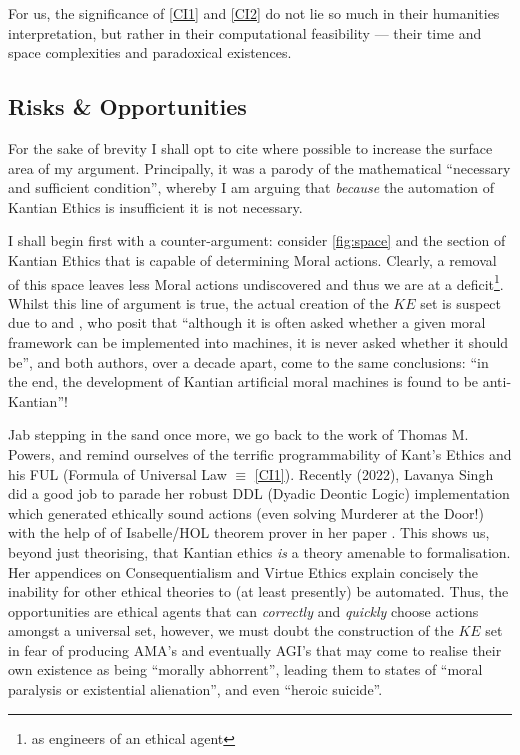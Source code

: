 \documentclass{scrartcl}
\begin{document}
For us, the significance of \ref{CI1} and \ref{CI2} do not lie so much in their humanities interpretation, but rather in their computational feasibility --- their time and space complexities and paradoxical existences.

\subsection{Risks \& Opportunities}
For the sake of brevity I shall opt to cite where possible to increase the surface area of my argument. Principally, it was a parody of the mathematical ``necessary and sufficient condition'', whereby I am arguing that \emph{because} the automation of Kantian Ethics is insufficient it is not necessary.

I shall begin first with a counter-argument: consider \ref{fig:space} and the section of Kantian Ethics that is capable of determining Moral actions. Clearly, a removal of this space leaves less Moral actions undiscovered and thus we are at a deficit\footnote{as engineers of an ethical agent}. Whilst this line of argument is true, the actual creation of the \(KE\) set is suspect due to \cite{Tonkens2009} and \cite{Nath2021}, who posit that \enquote{although it is often asked whether a given moral framework can be implemented into machines, it is never asked whether it should be}, and both authors, over a decade apart, come to the same conclusions: \enquote{in the end, the development of Kantian artificial moral machines is found to be anti-Kantian}!

Jab stepping in the sand once more, we go back to the work of Thomas M. Powers, and remind ourselves of the terrific programmability of Kant's Ethics and his FUL (Formula of Universal Law \(\equiv\) \ref{CI1}). Recently (2022), Lavanya Singh did a good job to parade her robust DDL (Dyadic Deontic Logic) implementation which generated ethically sound actions (even solving Murderer at the Door!) with the help of of Isabelle/HOL theorem prover in her paper \cite{Singh2022}. This shows us, beyond just theorising, that Kantian ethics \emph{is} a theory amenable to formalisation. Her appendices on Consequentialism and Virtue Ethics explain concisely the inability for other ethical theories to (at least presently) be automated. Thus, the opportunities are ethical agents that can \emph{correctly} and \emph{quickly} choose actions amongst a universal set, however, we must doubt the construction of the \(KE\) set in fear of producing AMA's and eventually AGI's that may come to realise their own existence as being \enquote{morally abhorrent}, leading them to states of \enquote{moral paralysis or existential alienation}, and even \enquote{heroic suicide}\parencite{Tonkens2009}.
\end{document}

